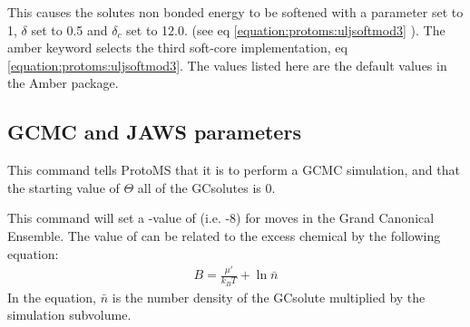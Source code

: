 \documentclass[letterpaper,10pt,english]{sphinxmanual}
\begin{document}
%
\begin{sphinxVerbatim}[commandchars=\\\{\}]
       
\end{sphinxVerbatim}

This causes the solutes non bonded energy to be softened with a parameter  set to 1, \(\delta\) set to 0.5 and \(\delta_c\)  set to 12.0. (see eq \eqref{equation:protoms:uljsoftmod3} ). The amber keyword selects the third soft-core implementation, eq \eqref{equation:protoms:uljsoftmod3}. The values listed here are the default values in the Amber package.


\subsection{GCMC and JAWS parameters}
\label{\detokenize{protoms:gcmc-and-jaws-parameters}}
\ignorespaces 
\def\sphinxLiteralBlockLabel{\label{\detokenize{protoms:index-55}}}
%
\begin{sphinxVerbatim}[commandchars=\\\{\}]
 
\end{sphinxVerbatim}

This command tells ProtoMS that it is to perform a GCMC simulation, and that the starting value of \(\Theta\) all of the GCsolutes is 0.

\ignorespaces 
\def\sphinxLiteralBlockLabel{\label{\detokenize{protoms:index-56}}}
%
\begin{sphinxVerbatim}[commandchars=\\\{\}]
 
\end{sphinxVerbatim}

This command will set a -value of  (i.e. -8) for moves in the Grand Canonical Ensemble. The value of  can be related to the excess chemical by the following equation:
\begin{equation}\label{equation:protoms:bval}
\begin{split}B = \frac{\mu'}{k_{B}T}+\ln \bar{n}\end{split}
\end{equation}
In the equation, \(\bar{n}\) is the number density of the GCsolute multiplied by the simulation subvolume.
\end{document}
